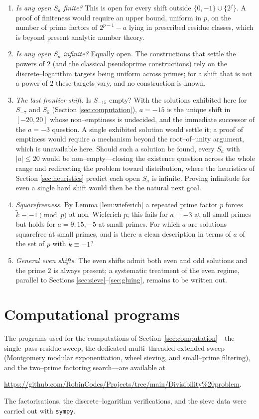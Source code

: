 \documentclass[11pt,reqno]{amsart}
\theoremstyle{plain}
\theoremstyle{definition}
\theoremstyle{remark}
\newcommand{\Sa}{S_a}
\begin{document}
\begin{enumerate}
\item \emph{Is any open $\Sa$ finite?} This is open for every shift outside $\{0,-1\}\cup\{2^{j}\}$. A proof of finiteness would require an upper bound, uniform in $p$, on the number of prime factors of $2^{p-1}-a$ lying in prescribed residue classes, which is beyond present analytic number theory.
\item \emph{Is any open $\Sa$ infinite?} Equally open. The constructions that settle the powers of $2$ (and the classical pseudoprime constructions) rely on the discrete--logarithm targets being uniform across primes; for a shift that is not a power of $2$ these targets vary, and no construction is known.
\item \emph{The last frontier shift.} Is $S_{-15}$ empty? With the solutions exhibited here for $S_{-7}$ and $S_5$ (Section \ref{sec:computation}), $a=-15$ is the unique shift in $[-20,20]$ whose non--emptiness is undecided, and the immediate successor of the $a=-3$ question. A single exhibited solution would settle it; a proof of emptiness would require a mechanism beyond the root--of--unity argument, which is unavailable here. Should such a solution be found, every $S_a$ with $|a|\le20$ would be non--empty---closing the existence question across the whole range and redirecting the problem toward distribution, where the heuristics of Section \ref{sec:heuristics} predict each open $S_a$ is infinite. Proving infinitude for even a single hard shift would then be the natural next goal.
\item \emph{Squarefreeness.} By Lemma \ref{lem:wieferich} a repeated prime factor $p$ forces $\widetilde k\equiv-1\pmod p$ at non--Wieferich $p$; this fails for $a=-3$ at all small primes but holds for $a=9,15,-5$ at small primes. For which $a$ are solutions squarefree at small primes, and is there a clean description in terms of $a$ of the set of $p$ with $\widetilde k\equiv-1$?
\item \emph{General even shifts.} The even shifts admit both even and odd solutions and the prime $2$ is always present; a systematic treatment of the even regime, parallel to Sections \ref{sec:sieve}--\ref{sec:gluing}, remains to be written out.
\end{enumerate}

\appendix

\section{Computational programs}\label{app:programs}
The programs used for the computations of Section~\ref{sec:computation}---the single--pass residue sweep, the dedicated multi--threaded extended sweep (Montgomery modular exponentiation, wheel sieving, and small--prime filtering), and the two--prime factoring search---are available at
\begin{center}
\url{https://github.com/RobinCodes/Projects/tree/main/Divisibility%20problem}.
\end{center}
The factorisations, the discrete--logarithm verifications, and the sieve data were carried out with \texttt{sympy}.
\end{document}
